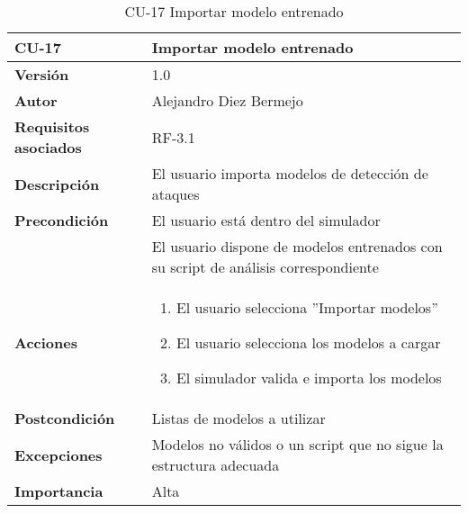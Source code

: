 \begin{table}[p]
	\centering
	\begin{tabularx}{\linewidth}{ p{} p{} }
		\toprule
		\textbf{CU-17}    & \textbf{Importar modelo entrenado}\\
		\toprule
		\textbf{Versión}              & 1.0    \\
		\textbf{Autor}                & Alejandro Diez Bermejo \\
		\textbf{Requisitos asociados} & RF-3.1 \\
		\textbf{Descripción}          & El usuario importa modelos de detección de ataques \\
        \textbf{Precondición}         & El usuario está dentro del simulador \\
                                      & El usuario dispone de modelos entrenados con su script de análisis correspondiente \\
		\textbf{Acciones}             &
		\begin{enumerate}
			\def\labelenumi{\arabic{enumi}.}
			\tightlist
			\item El usuario selecciona ”Importar modelos”
            \item El usuario selecciona los modelos a cargar
            \item El simulador valida e importa los modelos
		\end{enumerate}\\
		\textbf{Postcondición}        & Listas de modelos a utilizar \\
		\textbf{Excepciones}          & Modelos no válidos o un script que no sigue la estructura adecuada \\
		\textbf{Importancia}          & Alta \\
		\bottomrule
	\end{tabularx}
	\caption{CU-17 Importar modelo entrenado}
\end{table}

